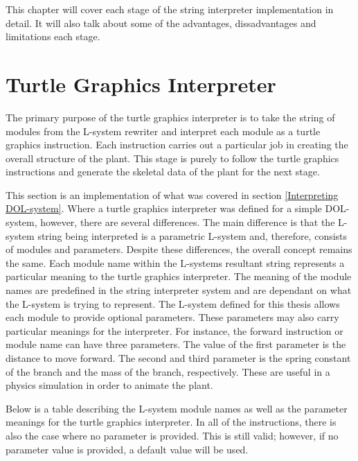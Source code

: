\noindent
This chapter will cover each stage of the string interpreter implementation in detail. It will also talk about some of the advantages, dissadvantages and limitations each stage. 

\section{Turtle Graphics Interpreter}

The primary purpose of the turtle graphics interpreter is to take the string of modules from the L-system rewriter and interpret each module as a turtle graphics instruction. Each instruction carries out a particular job in creating the overall structure of the plant. This stage is purely to follow the turtle graphics instructions and generate the skeletal data of the plant for the next stage.

This section is an implementation of what was covered in section \ref{Interpreting DOL-system}. Where a turtle graphics interpreter was defined for a simple DOL-system, however, there are several differences. The main difference is that the L-system string being interpreted is a parametric L-system and, therefore, consists of modules and parameters. Despite these differences, the overall concept remains the same. Each module name within the L-systems resultant string represents a particular meaning to the turtle graphics interpreter. The meaning of the module names are predefined in the string interpreter system and are dependant on what the L-system is trying to represent. The L-system defined for this thesis allows each module to provide optional parameters. These parameters may also carry particular meanings for the interpreter. For instance, the forward instruction or module name  can have three parameters. The value of the first parameter is the distance to move forward. The second and third parameter is the spring constant of the branch and the mass of the branch, respectively. These are useful in a physics simulation in order to animate the plant. 

Below is a table describing the L-system module names as well as the parameter meanings for the turtle graphics interpreter. In all of the instructions, there is also the case where no parameter is provided. This is still valid; however, if no parameter value is provided, a default value will be used.

